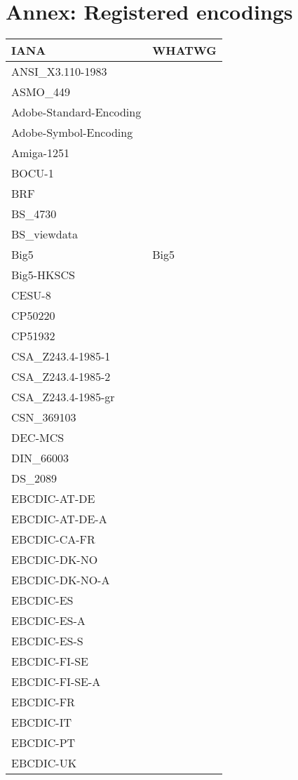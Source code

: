 \documentclass{wg21}
\begin{document}
\section{Annex: Registered encodings}
\begin{longtable}{| p{} | p{} |} 
\hline
\textbf{IANA} & \textbf{WHATWG} \\ \hline 
\hline
ANSI_X3.110-1983 & \\ \hline
ASMO_449 & \\ \hline
Adobe-Standard-Encoding & \\ \hline
Adobe-Symbol-Encoding & \\ \hline
Amiga-1251 & \\ \hline
BOCU-1 & \\ \hline
BRF & \\ \hline
BS_4730 & \\ \hline
BS_viewdata & \\ \hline
Big5 & Big5\\ \hline
Big5-HKSCS & \\ \hline
CESU-8 & \\ \hline
CP50220 & \\ \hline
CP51932 & \\ \hline
CSA_Z243.4-1985-1 & \\ \hline
CSA_Z243.4-1985-2 & \\ \hline
CSA_Z243.4-1985-gr & \\ \hline
CSN_369103 & \\ \hline
DEC-MCS & \\ \hline
DIN_66003 & \\ \hline
DS_2089 & \\ \hline
EBCDIC-AT-DE & \\ \hline
EBCDIC-AT-DE-A & \\ \hline
EBCDIC-CA-FR & \\ \hline
EBCDIC-DK-NO & \\ \hline
EBCDIC-DK-NO-A & \\ \hline
EBCDIC-ES & \\ \hline
EBCDIC-ES-A & \\ \hline
EBCDIC-ES-S & \\ \hline
EBCDIC-FI-SE & \\ \hline
EBCDIC-FI-SE-A & \\ \hline
EBCDIC-FR & \\ \hline
EBCDIC-IT & \\ \hline
EBCDIC-PT & \\ \hline
EBCDIC-UK & \\ \hline

\end{longtable}
\end{document}

